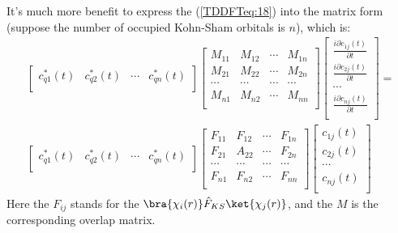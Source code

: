 It's much more benefit to express the (\ref{TDDFTeq:18}) into the
matrix form (suppose the number of occupied Kohn-Sham orbitals is
$n$), which is:
\begin{multline}\label{}
\begin{bmatrix}
c_{q1}^{*}(t) & c_{q2}^{*}(t) &  \cdots   & c_{qn}^{*}(t) \\
\end{bmatrix}
\begin{bmatrix}
     M_{11} & M_{12} & \cdots & M_{1n} \\
     M_{21} & M_{22} & \cdots & M_{2n} \\
     \cdots & \cdots & \cdots & \cdots \\
     M_{n1} & M_{n2} & \cdots & M_{nn} \\
   \end{bmatrix}
\begin{bmatrix}
  \frac{i\partial c_{1j}(t)}{\partial t} \\
  \frac{i\partial c_{2j}(t)}{\partial t} \\
  \cdots \\
  \frac{i\partial c_{nj}(t)}{\partial t} \\
\end{bmatrix}
= \\
\begin{bmatrix}
c_{q1}^{*}(t) & c_{q2}^{*}(t) &  \cdots   & c_{qn}^{*}(t) \\
\end{bmatrix}
\begin{bmatrix}
     F_{11} & F_{12} & \cdots & F_{1n} \\
     F_{21} & A_{22} & \cdots & F_{2n} \\
     \cdots & \cdots & \cdots & \cdots \\
     F_{n1} & F_{n2} & \cdots & F_{nn} \\
   \end{bmatrix}
\begin{bmatrix}
  c_{1j}(t) \\
  c_{2j}(t) \\
  \cdots    \\
  c_{nj}(t) \\
\end{bmatrix}
\end{multline}
Here the $F_{ij}$ stands for the
$\bra{\chi_{i}(r)}\hat{F}_{KS}\ket{\chi_{j}(r)}$, and the $M$ is the
corresponding overlap matrix.

